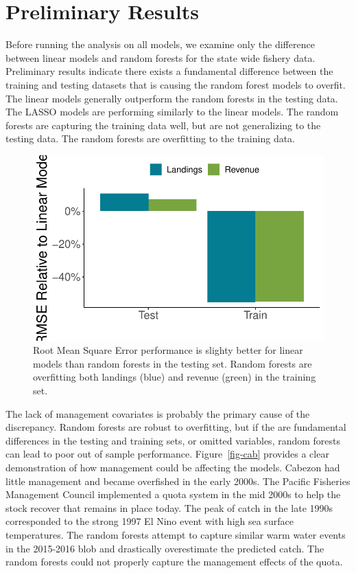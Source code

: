 \documentclass[
  letterpaper,
  DIV=11,
  numbers=noendperiod]{scrartcl}
\begin{document}
\hypertarget{sec-results}{%
\section{Preliminary Results}\label{sec-results}}

Before running the analysis on all models, we examine only the
difference between linear models and random forests for the state wide
fishery data. Preliminary results indicate there exists a fundamental
difference between the training and testing datasets that is causing the
random forest models to overfit. The linear models generally outperform
the random forests in the testing data. The LASSO models are performing
similarly to the linear models. The random forests are capturing the
training data well, but are not generalizing to the testing data. The
random forests are overfitting to the training data.

\begin{figure}

{\centering \includegraphics{ibi-ml_files/figure-pdf/fig-rmse-1.pdf}

}

\caption{\label{fig-rmse}Root Mean Square Error performance is slighty
better for linear models than random forests in the testing set. Random
forests are overfitting both landings (blue) and revenue (green) in the
training set.}

\end{figure}

The lack of management covariates is probably the primary cause of the
discrepancy. Random forests are robust to overfitting, but if the are
fundamental differences in the testing and training sets, or omitted
variables, random forests can lead to poor out of sample performance.
Figure~\ref{fig-cab} provides a clear demonstration of how management
could be affecting the models. Cabezon had little management and became
overfished in the early 2000s. The Pacific Fisheries Management Council
implemented a quota system in the mid 2000s to help the stock recover
that remains in place today. The peak of catch in the late 1990s
corresponded to the strong 1997 El Nino event with high sea surface
temperatures. The random forests attempt to capture similar warm water
events in the 2015-2016 blob and drastically overestimate the predicted
catch. The random forests could not properly capture the management
effects of the quota.
\end{document}
